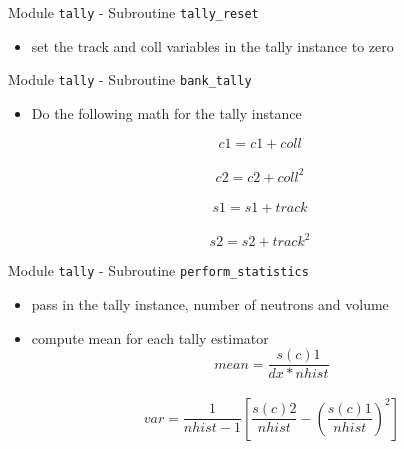 \documentclass{beamer}
\begin{document}
\begin{frame}{Module \texttt{tally} - Subroutine \texttt{tally\_reset}}

  \begin{itemize}
    \item set the track and coll variables in the tally instance to zero
  \end{itemize}

\end{frame}
\begin{frame}{Module \texttt{tally} - Subroutine \texttt{bank\_tally}}

  \begin{itemize}
    \item Do the following math for the tally instance
  \end{itemize}
\[c1 = c1 + coll\] \\
\[  c2 = c2 + coll^{2} \] \\
\[  s1 = s1 + track \] \\
\[  s2 = s2 + track^{2} \]

\end{frame}
\begin{frame}{Module \texttt{tally} - Subroutine \texttt{perform\_statistics}}
  \begin{itemize}
    \item pass in the tally instance, number of neutrons and volume
    \vfill\item compute mean for each tally estimator
\[
 mean = \frac{s(c)1}{dx*nhist}\] \\
\[
 var = \frac{1}{nhist - 1}\left[ \frac{s(c)2}{nhist} - \left( \frac{s(c)1}{nhist} \right)^{2} \right ]
\]

  \end{itemize}

\end{frame}
\end{document}
